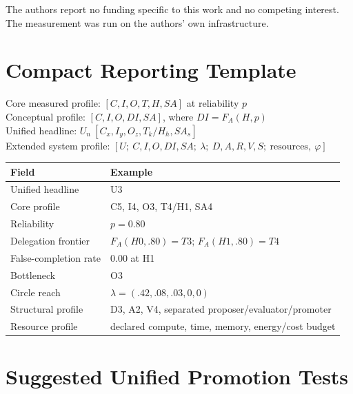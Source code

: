 \documentclass[11pt]{article}
\theoremstyle{definition}
\newcommand{\FA}{\ensuremath{F_A(H,p)}}
\begin{document}
The authors report no funding specific to this work and no competing interest. The measurement was run on the authors' own infrastructure.




\appendix

\section{Compact Reporting Template}

\begin{center}
Core measured profile: $[C, I, O, T, H, SA]$ at reliability $p$\\
Conceptual profile: $[C, I, O, DI, SA]$, where $DI = \FA{}$\\
Unified headline: $U_n\ [C_x, I_y, O_z, T_k/H_h, SA_s]$\\
Extended system profile: $[U;\ C,I,O,DI,SA;\ \lambda;\ D,A,R,V,S;\ \text{resources},\ \varphi]$
\end{center}

\begin{table}[h]
\centering\small
\begin{tabularx}{\textwidth}{@{}lY@{}}
\toprule
Field & Example \\
\midrule
Unified headline & U3 \\
Core profile & C5, I4, O3, T4/H1, SA4 \\
Reliability & $p = 0.80$ \\
Delegation frontier & $F_A(H0,.80)=T3$; $F_A(H1,.80)=T4$ \\
False-completion rate \emph{} & 0.00 at H1 \\
Bottleneck & O3 \\
Circle reach & $\lambda = (.42,.08,.03,0,0)$ \\
Structural profile & D3, A2, V4, separated proposer/evaluator/promoter \\
Resource profile & declared compute, time, memory, energy/cost budget \\
\bottomrule
\end{tabularx}
\end{table}

\section{Suggested Unified Promotion Tests}
\end{document}

